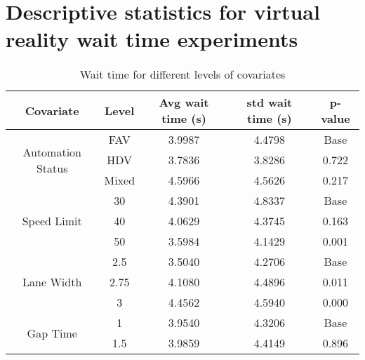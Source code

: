 \chapter{Descriptive statistics for virtual reality wait time experiments}
\label{A:data}


\begin{small}
\begin{longtable}{|ccccc|}
\caption{Wait time for different levels of covariates}\\
\hline
\textbf{Covariate}                        & \textbf{Level}  & \textbf{Avg wait time   (s)} & \textbf{std wait time   (s)} & \textbf{p-value} \\ \hline\hline
\endhead
\multirow{3}{*}{Automation  Status}       & FAV             & 3.9987                       & 4.4798                       & Base             \\ 
                                          & HDV             & 3.7836                       & 3.8286                       & 0.722            \\ 
                                          & Mixed           & 4.5966                       & 4.5626                       & 0.217            \\ \hline
\multirow{3}{*}{Speed Limit}              & 30              & 4.3901                       & 4.8337                       & Base             \\ 
                                          & 40              & 4.0629                       & 4.3745                       & 0.163            \\ 
                                          & 50              & 3.5984                       & 4.1429                       & 0.001            \\ \hline
\multirow{3}{*}{Lane Width}               & 2.5             & 3.5040                       & 4.2706                       & Base             \\ 
                                          & 2.75            & 4.1080                       & 4.4896                       & 0.011            \\ 
                                          & 3               & 4.4562                       & 4.5940                       & 0.000            \\ \hline
\multirow{3}{*}{Gap Time}                 & 1               & 3.9540                       & 4.3206                       & Base             \\ 
                                          & 1.5             & 3.9859                       & 4.4149                       & 0.896            \\ 

\end{longtable}
\end{small}
